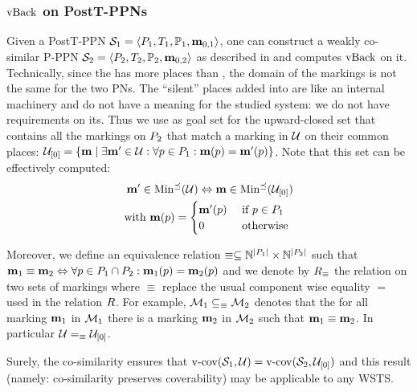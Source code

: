 \subsubsection{$\vback$ on PostT-PPNs}
\label{sec:vback-on-postt-ppns}

Given a PostT-PPN $\defPPN[1]$,
one can construct a weakly co-similar P-PPN $\defPPN[2]$ as described in  and computes $\vback$ on it.
Technically, since the \namePPN[2] has more places than \namePPN[1], the domain of the markings is not the same for the two PNs.
The ``silent'' places added into \namePPN[2] are like an internal machinery and do not have a meaning for the studied system: we do not have requirements on its.
Thus we use as goal set for \namePPN[2] the upward-closed set that contains all the markings on $\places_2$ that match a marking in $\ucs$ on their common places:
$
  \ucse = \setComp
            {\mar}
            {\exists \mar' \in \ucs
            : \forall p \in \places_1
            : \mar(p) = \mar'(p)}
$.
Note that this set can be effectively computed:
\begin{align*}
  \mar' \in \minp{\ucs}
  \Leftrightarrow
  \mar \in \minp{\ucse} \\
  \text{with }
  \mar(p) = \begin{cases}
    \mar'(p)  &\tif p \in \places_1 \\
    0         &\tothrw
  \end{cases}
\end{align*}

Moreover, we define an equivalence relation
$\equiv \subseteq \naturals^{\card{\places_1}} \times \naturals^{\card{\places_2}}$
such that
$
  \mar_1 \equiv \mar_2
  \Leftrightarrow
  \forall p \in \places_1 \cap \places_2 : \mar_1(p) = \mar_2(p)
$ and we denote by $\rela_\equiv$ the relation on two sets of markings where $\equiv$ replace the usual component wise equality $=$ used in the relation $\rela$.
For example, $\setm_1 \subseteq_\equiv \setm_2$ denotes that the for all marking $\mar_1$ in $\setm_1$ there is a marking  $\mar_2$ in $\setm_2$ such that $\mar_1 \equiv \mar_2$.
In particular $\ucs =_\equiv \ucse$.

Surely, the co-similarity ensures that
$\vcov{\namePPN[1]}{\ucs} = \vcov{\namePPN[2]}{\ucse}$
and this result (namely: co-similarity preserves coverability) may be applicable to any \ac{WSTS}.


